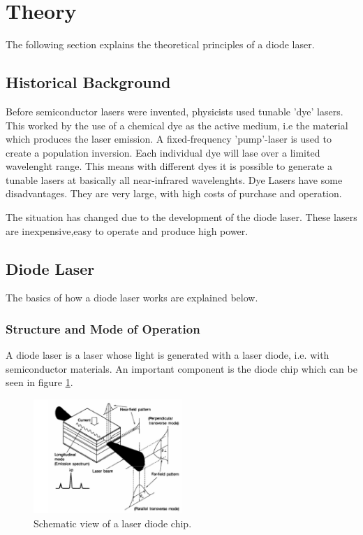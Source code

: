 \section{Theory}
\label{sec:theory}

The following section explains the theoretical principles of a diode laser.

\subsection{Historical Background}
\label{sec:Historical Background}

Before semiconductor lasers were invented, physicists used tunable 'dye' lasers.
This worked by the use of a chemical dye as the active medium, i.e the material which produces the laser emission.
A fixed-frequency 'pump'-laser is used to create a population inversion. Each individual dye will lase over a limited wavelenght range.
This means with different dyes it is possible to generate a tunable lasers at basically all near-infrared wavelenghts.
Dye Lasers have some disadvantages. They are very large, with high costs of purchase and operation.

The situation has changed due to the development of the diode laser. These lasers are inexpensive,easy to operate and produce high power.

\subsection{Diode Laser}
\label{sec:Diode Laser}

The basics of how a diode laser works are explained below.

\subsubsection{Structure and Mode of Operation}
\label{Structure and Mode of Operation}

A diode laser is a laser whose light is generated with a laser diode, i.e. with semiconductor materials.
An important component is the diode chip which can be seen in figure \ref{fig:diodechip}.

\begin{figure}[H]
    \centering
    \includegraphics[width=0.5\textwidth]{content/graphics/laserdiodechip.jpg}
    \caption{Schematic view of a laser diode chip.} %
    \label{fig:diodechip}
\end{figure}


